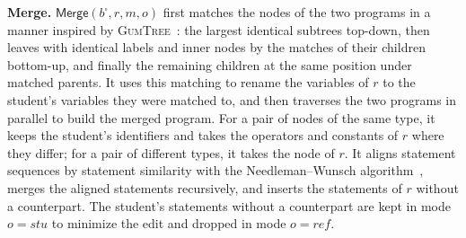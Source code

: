\documentclass[10pt,conference]{IEEEtran}
\begin{document}
\textbf{Merge.} $\mathsf{Merge}(b^{\square}, r, m, o)$ first matches the nodes of the two programs in a manner inspired by \textsc{GumTree}~\cite{falleri2014fine}: the largest identical subtrees top-down, then leaves with identical labels and inner nodes by the matches of their children bottom-up, and finally the remaining children at the same position under matched parents. It uses this matching to rename the variables of $r$ to the student's variables they were matched to, and then traverses the two programs in parallel to build the merged program. For a pair of nodes of the same type, it keeps the student's identifiers and takes the operators and constants of $r$ where they differ; for a pair of different types, it takes the node of $r$. It aligns statement sequences by statement similarity with the Needleman--Wunsch algorithm~\cite{needleman1970general}, merges the aligned statements recursively, and inserts the statements of $r$ without a counterpart. The student's statements without a counterpart are kept in mode $o = \mathit{stu}$ to minimize the edit and dropped in mode $o = \mathit{ref}$.
\end{document}
